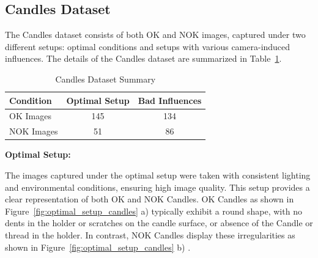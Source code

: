 \documentclass[12pt,DIV14,BCOR12mm,a4paper,footinclude=false,headinclude,parskip=half-,twoside,openright,cleardoublepage=empty,toc=index,bibliography=totoc,listof=totoc]{scrreprt}
\numberwithin{equation}{chapter}
\begin{document}
\subsection{Candles Dataset}
\label{sec:candles_dataset}
The Candles dataset consists of both OK and NOK images, captured under two different setups: optimal conditions and setups with various camera-induced influences. The details of the Candles dataset are summarized in Table~\ref{tab:candles-dataset}.

\begin{table}
    \centering
    \caption{Candles Dataset Summary}
    \label{tab:candles-dataset}
    \begin{tabular}{lcc}
        \toprule
        \textbf{Condition} & \textbf{Optimal Setup} & \textbf{Bad Influences} \\ 
        \midrule
        OK Images          & 145                    & 134                     \\ 
        NOK Images         & 51                     & 86                      \\ 
        \bottomrule
    \end{tabular}
\end{table}



\textbf{Optimal Setup:}

The images captured under the optimal setup were taken with consistent lighting and environmental conditions, ensuring high image quality. This setup provides a clear representation of both OK and NOK Candles. OK Candles as shown in Figure~\ref{fig:optimal_setup_candles} a) typically exhibit a round shape, with no dents in the holder or scratches on the candle surface, or absence of the Candle or thread in the holder. In contrast, NOK Candles display these irregularities as shown in Figure~\ref{fig:optimal_setup_candles} b) .
\end{document}
